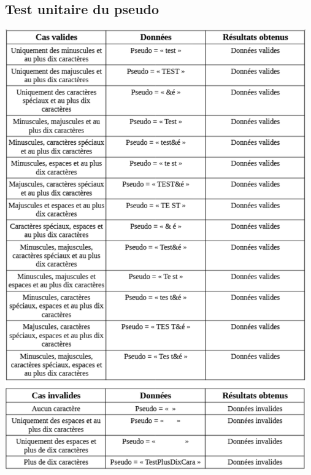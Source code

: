 \documentclass[12pt,a4paper]{article}
\begin{document}
        \subsection{Test unitaire du pseudo}
            \label{subsec:test_unitaire_pseudo}
            \includegraphics[width=13cm]{images/test_unitaire_pseudo.png}
\end{document}

